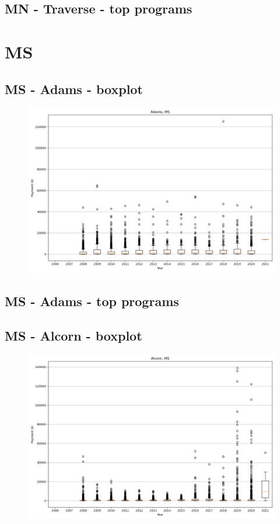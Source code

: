 \subsection*{MN - Traverse - top programs}

\newpage
\section*{MS}
\subsection*{MS - Adams - boxplot}
\begin{figure}[h]
\centering
\includegraphics[width=7in]{../output/boxplots/counties/Adams-MS_boxplot.png}
\end{figure}


\subsection*{MS - Adams - top programs}

\newpage
\subsection*{MS - Alcorn - boxplot}
\begin{figure}[h]
\centering
\includegraphics[width=7in]{../output/boxplots/counties/Alcorn-MS_boxplot.png}
\end{figure}


